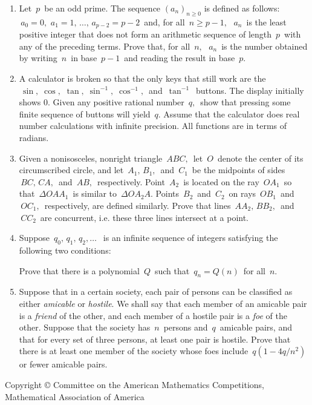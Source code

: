 \begin{enumerate}
\item %
Let $\, p \,$ be an odd prime.  The sequence $(a_n)_{n \geq 0}$ is
defined as follows: $\, a_0 = 0, $ $a_1 = 1, \, \ldots,
\, a_{p-2} = p-2 \,$ and, for all $\, n \geq p-1, \,$ $\, a_n \,$
is the least positive integer that does not form an arithmetic
sequence of length $\, p \,$ with any of the preceding terms.
Prove that, for all $\, n, \,$ $\, a_n \,$ is the number obtained
by writing $\, n \,$ in base $\, p-1 \,$ and reading the result 
in base $\, p$.

\item %
A calculator is broken so that the only keys that still work are
the $\, \sin, \; \cos, $  $\tan, \; \sin^{-1}, \; \cos^{-1}, \,$
and $\, \tan^{-1} \,$ buttons.  The display initially shows 0.
Given any positive rational number $\, q, \,$ show that pressing
some finite sequence of buttons will yield $\, q$.   Assume that
the calculator does real number calculations with infinite
precision.  All functions are in terms of radians.


\item %
Given a nonisosceles, nonright triangle $\, ABC, \,$ let
$\, O \,$ denote the center of its circumscribed circle, and let
$\, A_1, \, B_1, \,$ and $\, C_1 \,$ be the midpoints of
sides $\, BC, \, CA, \,$ and $\, AB, \,$ respectively.
Point $\, A_2 \,$ is located on the ray
$\, OA_1 \,$ so that $\, \Delta OAA_1 \,$ is similar
to $\, \Delta OA_2A$.  Points $\, B_2 \,$
and $\, C_2 \,$ on rays $\, OB_1 \,$ and $\, OC_1, \,$
respectively, are defined similarly.  
Prove that lines $\, AA_2, \, BB_2, \,$
and $\, CC_2 \,$ are concurrent, i.e. these three lines intersect
at a point.

\item %
Suppose $\, q_0, \, q_1, \,  q_2, \ldots \; \,$ is an infinite
sequence of integers satisfying the following two conditions:
Prove that there is a polynomial $\, Q \,$ such that
$\, q_n = Q(n) \,$ for all $\, n$.

\item %
Suppose that in a certain society, each pair of persons can be
classified as either {\em amicable} or {\em hostile}. We shall say
that each member of an amicable pair is a {\em friend} of the
other, and each member of a hostile pair is a {\em foe} of the
other.  Suppose that the society has $\, n \,$ persons and $\, q
\,$ amicable pairs, and that for every set of three persons, at
least one pair is hostile.  Prove that there is at least one
member of the society whose foes include $\, q(1 - 4q/n^2) \,$ or
fewer amicable pairs.  
\end{enumerate}
\vspace*{\fill}
\begin{center}
{\footnotesize Copyright \copyright \hspace{.05in} Committee on
the American
Mathematics Competitions, \\ Mathematical Association of America}
\end{center}


